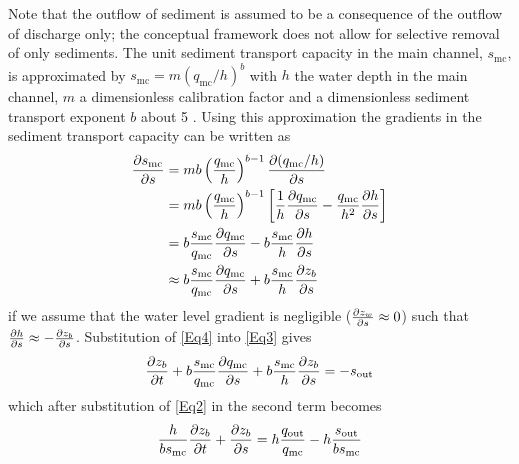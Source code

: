 Note that the outflow of sediment is assumed to be a consequence of the outflow of discharge only; the conceptual framework does not allow for selective removal of only sediments.	
The unit sediment transport capacity in the main channel, $s_\text{mc}$, is approximated by $s_\text{mc} = m \left ( q_\text{mc} / h \right )^b$ with $h$ the water depth  in the main channel, $m$ a dimensionless calibration factor and a dimensionless sediment transport exponent $b$ about 5 \citep{Engelundh67}.
Using this approximation the gradients in the sediment transport capacity can be written as
%
\begin{align}
\pdiff{s_\text{mc}}{s} &= m b \left ( \frac{q_\text{mc}}{h} \right )^{b-1} \pdiff{(q_\text{mc} / h)}{s} \\
&= m b \left ( \frac{q_\text{mc}}{h} \right )^{b-1} \left [ \frac{1}{h} \pdiff{q_\text{mc}}{s} - \frac{q_\text{mc}}{h^2} \pdiff{h}{s} \right ] \\
&= b \frac{s_\text{mc}}{q_\text{mc}} \pdiff{q_\text{mc}}{s} - b \frac{s_\text{mc}}{h} \pdiff{h}{s} \\
&\approx b \frac{s_\text{mc}}{q_\text{mc}} \pdiff{q_\text{mc}}{s} + b \frac{s_\text{mc}}{h} \pdiff{z_b}{s}
\label{Eq4}
\end{align}
%
if we assume that the water level gradient is negligible ($\pdiff{z_w}{s} \approx 0$) such that $\pdiff{h}{s} \approx -\pdiff{z_b}{s}$.
Substitution of \autoref{Eq4} into \autoref{Eq3} gives
%
\begin{equation}
\pdiff{z_b}{t} + b \frac{s_\text{mc}}{q_\text{mc}} \pdiff{q_\text{mc}}{s} + b \frac{s_\text{mc}}{h} \pdiff{z_b}{s} = -s_\text{out}
\label{Eq5a}
\end{equation}
%
which after substitution of \autoref{Eq2} in the second term becomes
%
\begin{equation}
\frac{h}{b s_\text{mc}} \pdiff{z_b}{t} + \pdiff{z_b}{s} = h \frac{q_\text{out}}{q_\text{mc}} - h \frac{s_\text{out}}{b s_\text{mc}}
\label{Eq5}
\end{equation}

